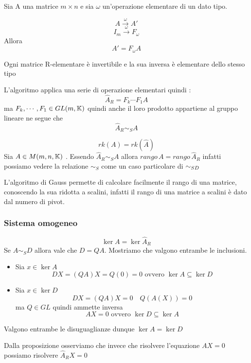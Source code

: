 \begin{lem}
Sia A una matrice $ m \times n $ e sia $ \omega $ un'operazione elementare di un dato tipo.

$$A\xrightarrow{\omega}A'$$
$$ I_m \xrightarrow {\omega} F_\omega $$Allora $$A'=F_\omega A$$

\end{lem}\spazio
\begin{lem}
Ogni matrice R-elementare è invertibile e la sua inversa è elementare dello stesso tipo
\end{lem}

\begin{oss}
L'algoritmo applica una serie di operazione elementari quindi :
$$ \hat{A}_R=F_k \cdots F_1 A $$ ma $F_k ,\cdots, F_1 \in GL (m,\mathbb{K}) $ quindi anche il loro prodotto appartiene al gruppo lineare ne segue che 
$$ \hat{A}_R \sim_S A$$ %
\end{oss}

\spazio
\begin{prop}[Rango] $$rk(A)=rk(\hat{A} )$$
\proof 
Sia $ A \in M(m,n, \mathbb{K}) $ .
Essendo $ \hat{A}_R \sim_S A$ allora $ rango \, A = rango \, \hat{A}_R$ infatti possiamo vedere la relazione $\sim_S$ come un caso particolare di $\sim_{SD}$\\
\begin{oss} 
L'algoritmo di Gauss permette di calcolare facilmente il rango di una matrice, conoscendo la sua ridotta a scalini, infatti il rango di una matrice a scalini \`e dato dal numero di pivot.
\end{oss}
\end{prop}
\newpage
\subsubsection{Sistema omogeneo}
\begin{prop}[Nucleo] $$\ker A= \ker \hat{A}_R$$ 
\proof
Se $ A \sim_S D $ allora vale che $D=QA$.
Mostriamo che valgono entrambe le inclusioni.
\begin{itemize}
\item Sia $x \in \ker A $
$$ DX= (QA)X=Q(0)=0  \text{ ovvero }  \ker A  \subseteq \ker D $$
\item 
Sia $ x \in \ker D  $
$$  DX=(QA)X = 0 \quad Q(A(X))=0 $$  ma $ Q \in GL$ quindi ammette inversa  $$ AX=0 \text{ ovvero } \ker D  \subseteq \ker A $$
\end{itemize}
Valgono entrambe le disuguaglianze dunque $\ker A =\ker D$
\endproof
\end{prop}
\begin{oss}
Dalla proposizione osserviamo che invece che risolvere l'equazione
$ AX=0$ possiamo risolvere $ \hat{A}_R X=0$
\end{oss}
